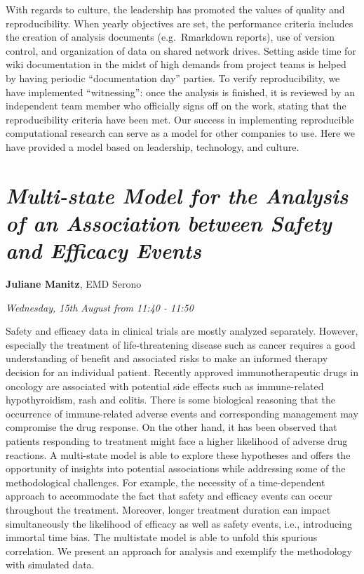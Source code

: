 \documentclass[]{book}
\theoremstyle{definition}
\theoremstyle{definition}
\theoremstyle{definition}
\theoremstyle{remark}
\begin{document}
With regards to culture, the leadership has promoted the values of
quality and reproducibility. When yearly objectives are set, the
performance criteria includes the creation of analysis documents
(e.g.~Rmarkdown reports), use of version control, and organization of
data on shared network drives. Setting aside time for wiki documentation
in the midst of high demands from project teams is helped by having
periodic ``documentation day'' parties. To verify reproducibility, we
have implemented ``witnessing'': once the analysis is finished, it is
reviewed by an independent team member who officially signs off on the
work, stating that the reproducibility criteria have been met. Our
success in implementing reproducible computational research can serve as
a model for other companies to use. Here we have provided a model based
on leadership, technology, and culture.

\hypertarget{multi-state-model-for-the-analysis-of-an-association-between-safety-and-efficacy-events}{%
\section{\texorpdfstring{\emph{Multi-state Model for the Analysis of an
Association between Safety and Efficacy
Events}}{Multi-state Model for the Analysis of an Association between Safety and Efficacy Events}}\label{multi-state-model-for-the-analysis-of-an-association-between-safety-and-efficacy-events}}

\textbf{Juliane Manitz}, EMD Serono

\emph{Wednesday, 15th August from 11:40 - 11:50}

Safety and efficacy data in clinical trials are mostly analyzed
separately. However, especially the treatment of life-threatening
disease such as cancer requires a good understanding of benefit and
associated risks to make an informed therapy decision for an individual
patient. Recently approved immunotherapeutic drugs in oncology are
associated with potential side effects such as immune-related
hypothyroidism, rash and colitis. There is some biological reasoning
that the occurrence of immune-related adverse events and corresponding
management may compromise the drug response. On the other hand, it has
been observed that patients responding to treatment might face a higher
likelihood of adverse drug reactions. A multi-state model is able to
explore these hypotheses and offers the opportunity of insights into
potential associations while addressing some of the methodological
challenges. For example, the necessity of a time-dependent approach to
accommodate the fact that safety and efficacy events can occur
throughout the treatment. Moreover, longer treatment duration can impact
simultaneously the likelihood of efficacy as well as safety events,
i.e., introducing immortal time bias. The multistate model is able to
unfold this spurious correlation. We present an approach for analysis
and exemplify the methodology with simulated data.
\end{document}
